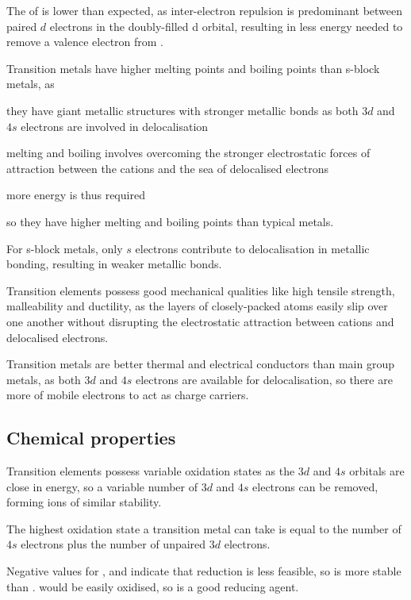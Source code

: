 \documentclass[Chemistry.tex]{subfiles}
\begin{document}
The  of  is lower than expected, as inter-electron repulsion is predominant between paired \(d\) electrons in the doubly-filled d orbital, resulting in less energy needed to remove a valence electron from .

Transition metals have higher melting points and boiling points than s-block metals, as \begin{slinenum}
\item they have giant metallic structures with stronger metallic bonds as both \(3d\) and \(4s\) electrons are involved in delocalisation
\item melting and boiling involves overcoming the stronger electrostatic forces of attraction between the cations and the sea of delocalised electrons
\item more energy is thus required
\item so they have higher melting and boiling points than typical metals.
\end{slinenum}

For s-block metals, only \(s\) electrons contribute to delocalisation in metallic bonding, resulting in weaker metallic bonds.

Transition elements possess good mechanical qualities like high tensile strength, malleability and ductility, as the layers of closely-packed atoms easily slip over one another without disrupting the electrostatic attraction between cations and delocalised electrons.

Transition metals are better thermal and electrical conductors than main group metals, as both \(3d\) and \(4s\) electrons are available for delocalisation, so there are more of mobile electrons to act as charge carriers.
\subsection{Chemical properties}
Transition elements possess variable oxidation states as the \(3d\) and \(4s\) orbitals are close in energy, so a variable number of \(3d\) and \(4s\) electrons can be removed, forming ions of similar stability.

The highest oxidation state a transition metal can take is equal to the number of \(4s\) electrons plus the number of unpaired \(3d\) electrons.

Negative \slEo{} values for ,  and  indicate that reduction is less feasible, so  is more stable than .  would be easily oxidised, so  is a good reducing agent.
\end{document}
